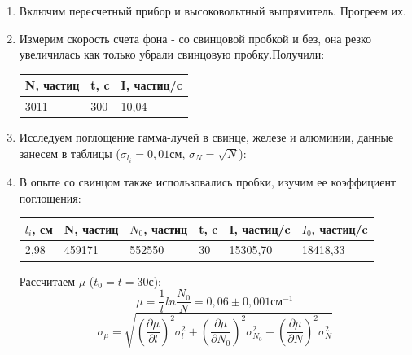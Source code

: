 \documentclass[a4paper]{article}
\begin{document}
\begin{enumerate}
    \item  Включим пересчетный прибор и высоковольтный выпрямитель. Прогреем их.

    \item Измерим скорость счета фона - со свинцовой пробкой и без, она резко увеличилась как только убрали свинцовую пробку.Получили:
    
    \begin{table}[H]
        \begin{center}
        \begin{tabular}{|l|l|l|}
        \hline
        N, частиц & t, c & I, частиц/c \\ \hline
        3011      & 300  & 10,04       \\ \hline
        \end{tabular}
        \end{center}
        \end{table}

   


    \item Исследуем поглощение гамма-лучей в свинце, железе и алюминии, данные занесем в таблицы ($\sigma_{l_i} = 0,01 см$, $ \sigma_N = \sqrt{N}$):
    
    \item В опыте со свинцом также использовались пробки, изучим ее коэффициент поглощения:
    
    \begin{table}[H]
        \begin{center}
        \begin{tabular}{|l|l|l|l|l|l|}
        \hline
        $l_i$, см & N, частиц & $N_0$, частиц & t, c & I, частиц/c & $I_0$, частиц/c \\ \hline
        2,98     & 459171    & 552550       & 30   & 15305,70    & 18418,33       \\ \hline
        \end{tabular}
        \end{center}
        \end{table}
    
        Рассчитаем $\mu$ ($t_0 = t = 30 с$): 
         \begin{equation}
             \mu = \frac{1}{l}ln\frac{N_0}{N} = 0,06 \pm 0,001 см^{-1}
         \end{equation}
         \begin{equation}
            \sigma_{\mu} = \sqrt{(\frac{\partial \mu}{\partial l})^2\sigma_l^2+(\frac{\partial \mu}{\partial N_0})^2\sigma_{N_0}^2+ (\frac{\partial \mu}{\partial N})^2\sigma_N^2}
        \end{equation}


\end{enumerate}
\end{document}
